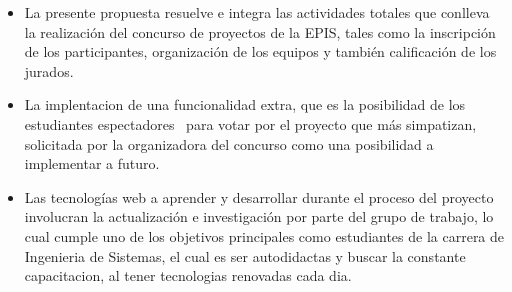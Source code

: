 \documentclass[%
 reprint,
 amsmath,amssymb,
 aps,
]{revtex4-1}
\begin{document}
\begin{itemize}
\item La presente propuesta resuelve e integra las actividades totales que conlleva la realización del concurso de proyectos de la EPIS, tales como la inscripción de los participantes, organización de los equipos y también calificación de los jurados. 

\item La implentacion de una funcionalidad extra, que es la posibilidad de los estudiantes espectadores  para votar por el proyecto que más simpatizan,  solicitada por la organizadora del concurso como una posibilidad a implementar a futuro. 

\item Las tecnologías web a aprender y desarrollar durante el proceso del proyecto involucran la actualización e investigación por parte del grupo de trabajo, lo cual cumple uno de los objetivos principales como estudiantes de la carrera de Ingenieria de Sistemas, el cual es ser autodidactas y buscar la constante capacitacion, al tener tecnologias renovadas cada dia.
 

\end{itemize}


%
%
\end{document}
